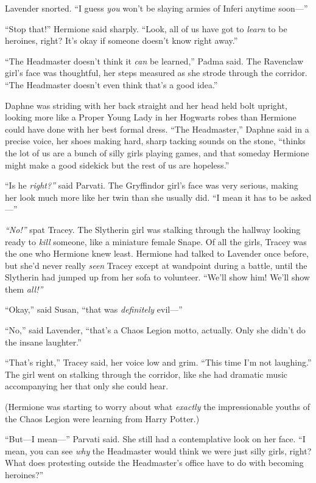 Lavender snorted. ``I guess \emph{you} won't be slaying armies of Inferi
anytime soon---''

``Stop that!'' Hermione said sharply. ``Look, all of us have got to
\emph{learn} to be heroines, right? It's okay if someone doesn't know
right away.''

``The Headmaster doesn't think it \emph{can} be learned,'' Padma said.
The Ravenclaw girl's face was thoughtful, her steps measured as she
strode through the corridor. ``The Headmaster doesn't even think that's
a good idea.''

Daphne was striding with her back straight and her head held bolt
upright, looking more like a Proper Young Lady in her Hogwarts robes
than Hermione could have done with her best formal dress. ``The
Headmaster,'' Daphne said in a precise voice, her shoes making hard,
sharp tacking sounds on the stone, ``thinks the lot of us are a bunch of
silly girls playing games, and that someday Hermione might make a good
sidekick but the rest of us are hopeless.''

``Is he \emph{right?''} said Parvati. The Gryffindor girl's face was
very serious, making her look much more like her twin than she usually
did. ``I mean it has to be asked---''

\emph{``No!''} spat Tracey. The Slytherin girl was stalking through the
hallway looking ready to \emph{kill} someone, like a miniature female
Snape. Of all the girls, Tracey was the one who Hermione knew least.
Hermione had talked to Lavender once before, but she'd never really
\emph{seen} Tracey except at wandpoint during a battle, until the
Slytherin had jumped up from her sofa to volunteer. ``We'll show him!
We'll show them \emph{all!''}

``Okay,'' said Susan, ``that was \emph{definitely} evil---''

``No,'' said Lavender, ``that's a Chaos Legion motto, actually. Only she
didn't do the insane laughter.''

``That's right,'' Tracey said, her voice low and grim. ``This time I'm
not laughing.'' The girl went on stalking through the corridor, like she
had dramatic music accompanying her that only she could hear.

(Hermione was starting to worry about what \emph{exactly} the
impressionable youths of the Chaos Legion were learning from Harry
Potter.)

``But---I mean---'' Parvati said. She still had a contemplative look on
her face. ``I mean, you can see \emph{why} the Headmaster would think we
were just silly girls, right? What does protesting outside the
Headmaster's office have to do with becoming heroines?''

